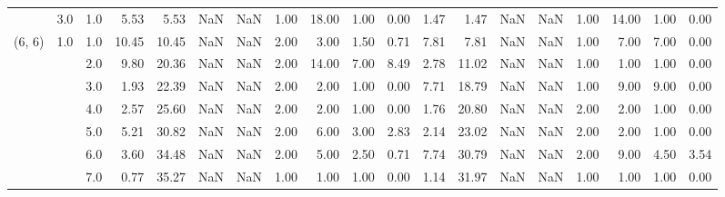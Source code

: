 \begin{tabular}{lllrrrrrrrrrrrrrrrr}
       & 3.0 & 1.0  &      5.53 &       5.53 &               NaN &                NaN &  1.00 &  18.00 &             1.00 &                         0.00 &      1.47 &       1.47 &               NaN &                NaN & 1.00 &  14.00 &             1.00 &                         0.00 \\
(6, 6) & 1.0 & 1.0  &     10.45 &      10.45 &               NaN &                NaN &  2.00 &   3.00 &             1.50 &                         0.71 &      7.81 &       7.81 &               NaN &                NaN & 1.00 &   7.00 &             7.00 &                         0.00 \\
       &     & 2.0  &      9.80 &      20.36 &               NaN &                NaN &  2.00 &  14.00 &             7.00 &                         8.49 &      2.78 &      11.02 &               NaN &                NaN & 1.00 &   1.00 &             1.00 &                         0.00 \\
       &     & 3.0  &      1.93 &      22.39 &               NaN &                NaN &  2.00 &   2.00 &             1.00 &                         0.00 &      7.71 &      18.79 &               NaN &                NaN & 1.00 &   9.00 &             9.00 &                         0.00 \\
       &     & 4.0  &      2.57 &      25.60 &               NaN &                NaN &  2.00 &   2.00 &             1.00 &                         0.00 &      1.76 &      20.80 &               NaN &                NaN & 2.00 &   2.00 &             1.00 &                         0.00 \\
       &     & 5.0  &      5.21 &      30.82 &               NaN &                NaN &  2.00 &   6.00 &             3.00 &                         2.83 &      2.14 &      23.02 &               NaN &                NaN & 2.00 &   2.00 &             1.00 &                         0.00 \\
       &     & 6.0  &      3.60 &      34.48 &               NaN &                NaN &  2.00 &   5.00 &             2.50 &                         0.71 &      7.74 &      30.79 &               NaN &                NaN & 2.00 &   9.00 &             4.50 &                         3.54 \\
       &     & 7.0  &      0.77 &      35.27 &               NaN &                NaN &  1.00 &   1.00 &             1.00 &                         0.00 &      1.14 &      31.97 &               NaN &                NaN & 1.00 &   1.00 &             1.00 &                         0.00 \\

\end{tabular}
